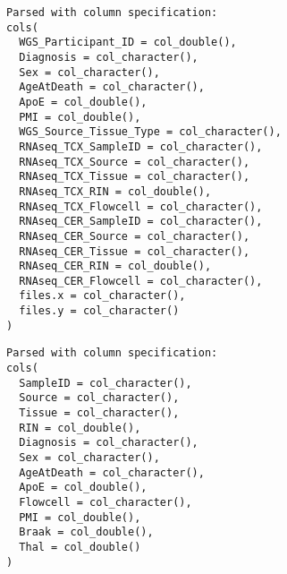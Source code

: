 \documentclass[]{book}
\newenvironment{Shaded}{\begin{snugshade}}{\end{snugshade}}
\newcommand{\DataTypeTok}[1]{\textcolor[rgb]{0.13,0.29,0.53}{#1}}
\newcommand{\KeywordTok}[1]{\textcolor[rgb]{0.13,0.29,0.53}{\textbf{#1}}}
\newcommand{\NormalTok}[1]{#1}
\newcommand{\OperatorTok}[1]{\textcolor[rgb]{0.81,0.36,0.00}{\textbf{#1}}}
\newcommand{\StringTok}[1]{\textcolor[rgb]{0.31,0.60,0.02}{#1}}
\begin{document}
\begin{verbatim}
Parsed with column specification:
cols(
  WGS_Participant_ID = col_double(),
  Diagnosis = col_character(),
  Sex = col_character(),
  AgeAtDeath = col_character(),
  ApoE = col_double(),
  PMI = col_double(),
  WGS_Source_Tissue_Type = col_character(),
  RNAseq_TCX_SampleID = col_character(),
  RNAseq_TCX_Source = col_character(),
  RNAseq_TCX_Tissue = col_character(),
  RNAseq_TCX_RIN = col_double(),
  RNAseq_TCX_Flowcell = col_character(),
  RNAseq_CER_SampleID = col_character(),
  RNAseq_CER_Source = col_character(),
  RNAseq_CER_Tissue = col_character(),
  RNAseq_CER_RIN = col_double(),
  RNAseq_CER_Flowcell = col_character(),
  files.x = col_character(),
  files.y = col_character()
)
\end{verbatim}

\begin{Shaded}
\end{Shaded}

\begin{verbatim}
Parsed with column specification:
cols(
  SampleID = col_character(),
  Source = col_character(),
  Tissue = col_character(),
  RIN = col_double(),
  Diagnosis = col_character(),
  Sex = col_character(),
  AgeAtDeath = col_character(),
  ApoE = col_double(),
  Flowcell = col_character(),
  PMI = col_double(),
  Braak = col_double(),
  Thal = col_double()
)
\end{verbatim}

\begin{Shaded}
\end{Shaded}
\end{document}
